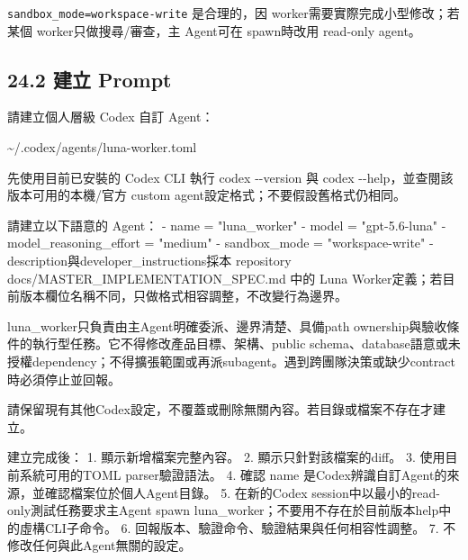 \documentclass[
  9pt,
  a4paper,
]{article}
\newenvironment{Shaded}{}{}
\newcommand{\NormalTok}[1]{#1}
\begin{document}
\texttt{sandbox\_\allowbreak{}mode=workspace-write} 是合理的，因
worker需要實際完成小型修改；若某個 worker只做搜尋/審查，主 Agent可在
spawn時改用 read-only agent。

\subsection{24.2 建立 Prompt}\label{242-ux5efaux7acb-prompt}

\begin{Shaded}
\begin{Highlighting}[]
\NormalTok{請建立個人層級 Codex 自訂 Agent：}

\NormalTok{\textasciitilde{}/.codex/agents/luna{-}worker.toml}

\NormalTok{先使用目前已安裝的 Codex CLI 執行 \textasciigrave{}codex {-}{-}version\textasciigrave{} 與 \textasciigrave{}codex {-}{-}help\textasciigrave{}，並查閱該版本可用的本機/官方 custom agent設定格式；不要假設舊格式仍相同。}

\NormalTok{請建立以下語意的 Agent：}
\NormalTok{{-} name = "luna\_\allowbreak{}worker"}
\NormalTok{{-} model = "gpt{-}5.6{-}luna"}
\NormalTok{{-} model\_\allowbreak{}reasoning\_\allowbreak{}effort = "medium"}
\NormalTok{{-} sandbox\_\allowbreak{}mode = "workspace{-}write"}
\NormalTok{{-} description與developer\_\allowbreak{}instructions採本 repository \textasciigrave{}docs/MASTER\_\allowbreak{}IMPLEMENTATION\_\allowbreak{}SPEC.md\textasciigrave{} 中的 Luna Worker定義；若目前版本欄位名稱不同，只做格式相容調整，不改變行為邊界。}

\NormalTok{luna\_\allowbreak{}worker只負責由主Agent明確委派、邊界清楚、具備path ownership與驗收條件的執行型任務。它不得修改產品目標、架構、public schema、database語意或未授權dependency；不得擴張範圍或再派subagent。遇到跨團隊決策或缺少contract時必須停止並回報。}

\NormalTok{請保留現有其他Codex設定，不覆蓋或刪除無關內容。若目錄或檔案不存在才建立。}

\NormalTok{建立完成後：}
\NormalTok{1. 顯示新增檔案完整內容。}
\NormalTok{2. 顯示只針對該檔案的diff。}
\NormalTok{3. 使用目前系統可用的TOML parser驗證語法。}
\NormalTok{4. 確認 \textasciigrave{}name\textasciigrave{} 是Codex辨識自訂Agent的來源，並確認檔案位於個人Agent目錄。}
\NormalTok{5. 在新的Codex session中以最小的read{-}only測試任務要求主Agent spawn \textasciigrave{}luna\_\allowbreak{}worker\textasciigrave{}；不要用不存在於目前版本help中的虛構CLI子命令。}
\NormalTok{6. 回報版本、驗證命令、驗證結果與任何相容性調整。}
\NormalTok{7. 不修改任何與此Agent無關的設定。}
\end{Highlighting}
\end{Shaded}
\end{document}
